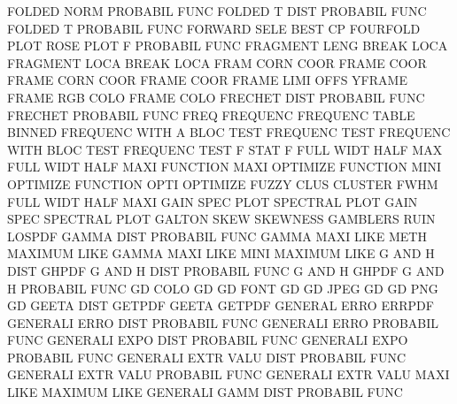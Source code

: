 FOLDED   NORM                           PROBABIL FUNC
FOLDED   T    DIST                      PROBABIL FUNC
FOLDED   T                              PROBABIL FUNC
FORWARD  SELE                           BEST     CP
FOURFOLD PLOT                           ROSE     PLOT
F                                       PROBABIL FUNC
FRAGMENT LENG                           BREAK    LOCA
FRAGMENT LOCA                           BREAK    LOCA
FRAM     CORN COOR                      FRAME    COOR
FRAME    CORN COOR                      FRAME    COOR
FRAME    LIMI OFFS                      YFRAME
FRAME    RGB  COLO                      FRAME    COLO
FRECHET  DIST                           PROBABIL FUNC
FRECHET                                 PROBABIL FUNC
FREQ                                    FREQUENC
FREQUENC TABLE                          BINNED
FREQUENC WITH A    BLOC TEST            FREQUENC TEST
FREQUENC WITH BLOC TEST                 FREQUENC TEST
F        STAT                           F
FULL     WIDT HALF MAX                  FULL     WIDT HALF MAXI
FUNCTION MAXI                           OPTIMIZE
FUNCTION MINI                           OPTIMIZE
FUNCTION OPTI                           OPTIMIZE
FUZZY    CLUS                           CLUSTER
FWHM                                    FULL     WIDT HALF MAXI
GAIN     SPEC PLOT                      SPECTRAL PLOT
GAIN     SPEC                           SPECTRAL PLOT
GALTON   SKEW                           SKEWNESS
GAMBLERS RUIN                           LOSPDF
GAMMA    DIST                           PROBABIL FUNC
GAMMA    MAXI LIKE METH                 MAXIMUM  LIKE
GAMMA    MAXI LIKE MINI                 MAXIMUM  LIKE
G        AND  H    DIST                 GHPDF
G        AND  H    DIST                 PROBABIL FUNC
G        AND  H                         GHPDF
G        AND  H                         PROBABIL FUNC
GD       COLO                           GD
GD       FONT                           GD
GD       JPEG                           GD
GD       PNG                            GD
GEETA    DIST                           GETPDF
GEETA                                   GETPDF
GENERAL  ERRO                           ERRPDF
GENERALI ERRO DIST                      PROBABIL FUNC
GENERALI ERRO                           PROBABIL FUNC
GENERALI EXPO DIST                      PROBABIL FUNC
GENERALI EXPO                           PROBABIL FUNC
GENERALI EXTR VALU DIST                 PROBABIL FUNC
GENERALI EXTR VALU                      PROBABIL FUNC
GENERALI EXTR VALU MAXI LIKE            MAXIMUM  LIKE
GENERALI GAMM DIST                      PROBABIL FUNC
